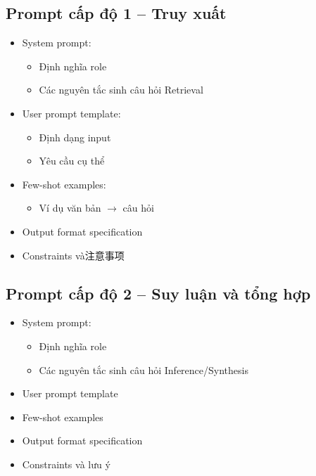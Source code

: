 \subsection{Prompt cấp độ 1 -- Truy xuất}
\begin{itemize}
    \item System prompt:
    \begin{itemize}
        \item Định nghĩa role
        \item Các nguyên tắc sinh câu hỏi Retrieval
    \end{itemize}
    \item User prompt template:
    \begin{itemize}
        \item Định dạng input
        \item Yêu cầu cụ thể
    \end{itemize}
    \item Few-shot examples:
    \begin{itemize}
        \item Ví dụ văn bản $\rightarrow$ câu hỏi
    \end{itemize}
    \item Output format specification
    \item Constraints và注意事项
\end{itemize}

\subsection{Prompt cấp độ 2 -- Suy luận và tổng hợp}
\begin{itemize}
    \item System prompt:
    \begin{itemize}
        \item Định nghĩa role
        \item Các nguyên tắc sinh câu hỏi Inference/Synthesis
    \end{itemize}
    \item User prompt template
    \item Few-shot examples
    \item Output format specification
    \item Constraints và lưu ý
\end{itemize}

